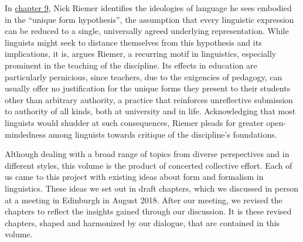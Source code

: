 \documentclass[output=paper]{langscibook}
\begin{document}
In \hyperref[chap:riemer]{chapter 9}, Nick Riemer identifies the ideologies of language he sees embodied in the ``unique form hypothesis'', the assumption that every linguistic expression can be reduced to a single, universally agreed underlying representation. While linguists might seek to distance themselves from this hypothesis and its implications, it is, argues Riemer, a recurring motif in linguistics, especially prominent in the teaching of the discipline. Its effects in education are particularly pernicious, since teachers, due to the exigencies of pedagogy, can usually offer no justification for the unique forms they present to their students other than arbitrary authority, a practice that reinforces unreflective submission to authority of all kinds, both at university and in life. Acknowledging that most linguists would shudder at such consequences, Riemer pleads for greater open-mindedness among linguists towards critique of the discipline's foundations.

Although dealing with a broad range of topics from diverse perspectives and in different styles, this volume is the product of concerted collective effort. Each of us came to this project with existing ideas about form and formalism in linguistics. These ideas we set out in draft chapters, which we discussed in person at a meeting in Edinburgh in August 2018. After our meeting, we revised the chapters to reflect the insights gained through our discussion. It is these revised chapters, shaped and harmonized by our dialogue, that are contained in this volume. 

\sloppy
\printbibliography[heading=subbibliography]
\end{document}

